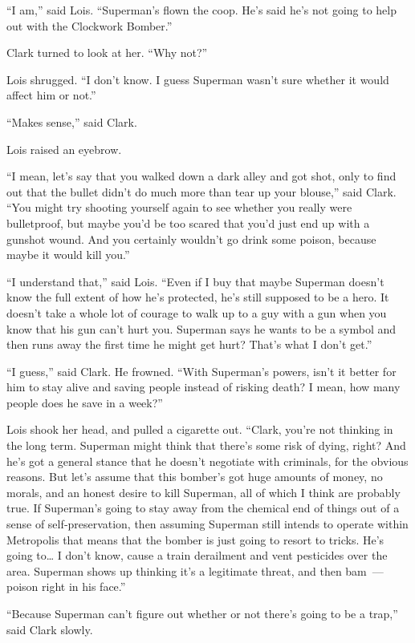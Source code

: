 ``I am,'' said Lois. ``Superman's flown the coop. He's said he's not
going to help out with the Clockwork Bomber.''

Clark turned to look at her. ``Why not?''

Lois shrugged. ``I don't know. I guess Superman wasn't sure whether it
would affect him or not.''

``Makes sense,'' said Clark.

Lois raised an eyebrow.

``I mean, let's say that you walked down a dark alley and got shot, only
to find out that the bullet didn't do much more than tear up your
blouse,'' said Clark. ``You might try shooting yourself again to see
whether you really were bulletproof, but maybe you'd be too scared that
you'd just end up with a gunshot wound. And you certainly wouldn't go
drink some poison, because maybe it would kill you.''

``I understand that,'' said Lois. ``Even if I buy that maybe Superman
doesn't know the full extent of how he's protected, he's still supposed
to be a hero. It doesn't take a whole lot of courage to walk up to a guy
with a gun when you know that his gun can't hurt you. Superman says he
wants to be a symbol and then runs away the first time he might get
hurt? That's what I don't get.''

``I guess,'' said Clark. He frowned. ``With Superman's powers, isn't it
better for him to stay alive and saving people instead of risking death?
I mean, how many people does he save in a week?''

Lois shook her head, and pulled a cigarette out. ``Clark, you're not
thinking in the long term. Superman might think that there's some risk
of dying, right? And he's got a general stance that he doesn't negotiate
with criminals, for the obvious reasons. But let's assume that this
bomber's got huge amounts of money, no morals, and an honest desire to
kill Superman, all of which I think are probably true. If Superman's
going to stay away from the chemical end of things out of a sense of
self‐preservation, then assuming Superman still intends to operate
within Metropolis that means that the bomber is just going to resort to
tricks. He's going to\ldots{} I don't know, cause a train derailment and
vent pesticides over the area. Superman shows up thinking it's a
legitimate threat, and then bam~--- poison right in his face.''

``Because Superman can't figure out whether or not there's going to be a
trap,'' said Clark slowly.

